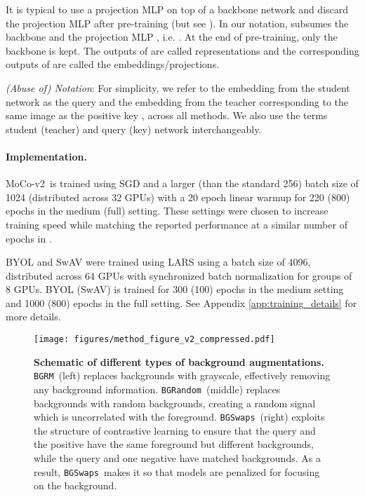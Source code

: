 \documentclass[twoside,11pt]{article}
\newcommand{\bgrm}{\texttt{BG\textunderscore RM}}
\newcommand{\bgswaps}{\texttt{BG\textunderscore Swaps}}
\newcommand{\bgrand}{\texttt{BG\textunderscore Random}}
\newcommand{\moco}{MoCo-v2}
\begin{document}
It is typical to use a projection MLP \citep{chen2020simple} on top of a backbone network and discard the projection MLP after pre-training (but see \citet{chen2020big}). In our notation,  subsumes the backbone  and the projection MLP , i.e. . At the end of pre-training, only the backbone  is kept. The outputs of  are called representations and the corresponding outputs of  are called the embeddings/projections.

\textit{(Abuse of) Notation}: For simplicity, we refer to the embedding from the student network as the query  and the embedding from the teacher corresponding to the same image  as the positive key , across all methods. We also use the terms student (teacher) and query (key) network interchangeably.

\paragraph{Implementation.}
\moco~is trained using SGD and a larger (than the standard 256) batch size  of 1024 (distributed across 32 GPUs) with a 20 epoch linear warmup for 220 (800) epochs in the medium (full) setting. These settings were chosen to increase training speed while matching the reported performance at a similar number of epochs in \citet{chen2020mocov2}.

BYOL and SwAV were trained using LARS \citep{you2017large} using a batch size of 4096, distributed across 64 GPUs with synchronized batch normalization \citep{ioffe_batch_2015} for groups of 8 GPUs. BYOL (SwAV) is trained for 300 (100) epochs in the medium setting and 1000 (800) epochs in the full setting. See Appendix \ref{app:training_details} for more details.   



\begin{figure}
    \centering
    \texttt{[image: figures/method\_figure\_v2\_compressed.pdf]}
    \caption{\textbf{Schematic of different types of background augmentations.} \bgrm~(left) replaces backgrounds with grayscale, effectively removing any background information. \bgrand~(middle) replaces backgrounds with random backgrounds, creating a random signal which is uncorrelated with the foreground. \bgswaps~(right) exploits the structure of contrastive learning to ensure that the query and the positive have the same foreground but different backgrounds, while the query and one negative have matched backgrounds. As a result, \bgswaps~makes it so that models are penalized for focusing on the background.}
    \label{fig:schematic}
\end{figure}
\end{document}
